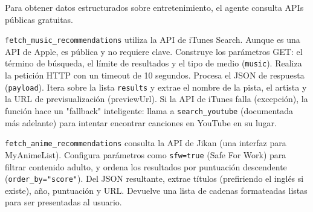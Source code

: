 \documentclass[letterpaper,12pt]{article}
\begin{document}
Para obtener datos estructurados sobre entretenimiento, el agente consulta APIs públicas gratuitas.

\texttt{fetch\_music\_recommendations} utiliza la API de iTunes Search. Aunque es una API de Apple, es pública y no requiere clave.
Construye los parámetros GET: el término de búsqueda, el límite de resultados y el tipo de medio (\texttt{music}).
Realiza la petición HTTP con un timeout de 10 segundos.
Procesa el JSON de respuesta (\texttt{payload}). Itera sobre la lista \texttt{results} y extrae el nombre de la pista, el artista y la URL de previsualización (previewUrl).
Si la API de iTunes falla (excepción), la función hace un "fallback" inteligente: llama a \texttt{search\_youtube} (documentada más adelante) para intentar encontrar canciones en YouTube en su lugar.

\texttt{fetch\_anime\_recommendations} consulta la API de Jikan (una interfaz para MyAnimeList).
Configura parámetros como \texttt{sfw=true} (Safe For Work) para filtrar contenido adulto, y ordena los resultados por puntuación descendente (\texttt{order\_by="score"}).
Del JSON resultante, extrae títulos (prefiriendo el inglés si existe), año, puntuación y URL.
Devuelve una lista de cadenas formateadas listas para ser presentadas al usuario.
\end{document}

